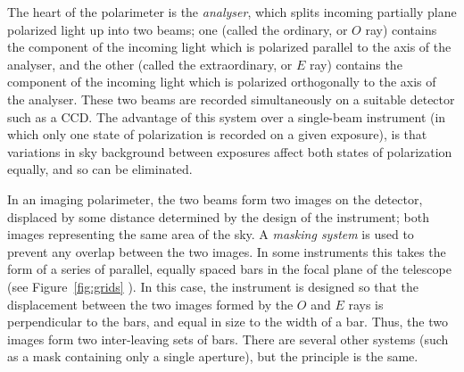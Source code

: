 \documentclass[twoside,11pt]{article}
\newcommand{\latex}[1]{#1}
\newcommand{\html}[1]{}
\renewcommand{\_}{\texttt{\symbol{95}}}
\begin{document}
The heart of the polarimeter is the \emph{analyser}, which splits incoming
partially plane polarized light up into two beams; one (called the
ordinary, or $O$ ray) contains the component of the incoming light
which is polarized parallel to the axis of the analyser, and the other
(called the extraordinary, or $E$ ray) contains the component of the
incoming light which is polarized orthogonally to the axis of the
analyser. These two beams are recorded simultaneously on a suitable
detector such as a CCD. The advantage of this system over a single-beam
instrument (in which only one state of polarization is recorded on a
given exposure), is that variations in sky background between exposures
affect both states of polarization equally, and so can be eliminated.

In an imaging polarimeter, the two beams form two images on the detector,
displaced by some distance determined by the design of the instrument;
both images representing the same area of the sky. A \emph{masking system}
is used to prevent any overlap between the two images. In some
instruments this takes the form of a series of parallel, equally spaced
bars in the focal plane of the telescope (see 
\latex{Figure~\ref{fig:grids}} \html{the next figure}). In
this case, the instrument is designed so that the displacement between
the two images formed by the $O$ and $E$ rays is perpendicular to the
bars, and equal in size to the width of a bar. Thus, the two images form
two inter-leaving sets of bars. There are several other systems (such as 
a mask containing only a single aperture), but the principle is the same.
\end{document}
